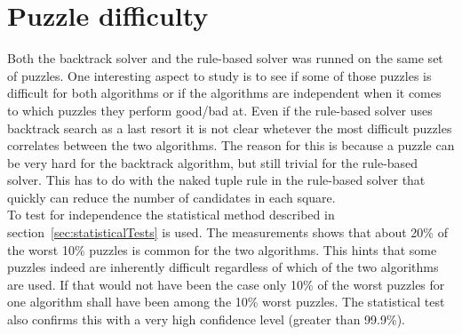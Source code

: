 \documentclass[a4paper,11pt]{kth-mag}
\begin{document}
\FloatBarrier
\section{Puzzle difficulty}
\label{sec:difficultyAnalysis}
Both the backtrack solver and the rule-based solver was runned on the same set of puzzles. One interesting aspect to study is to see if some of those puzzles is difficult for both algorithms or if the algorithms are independent when it comes to which puzzles they perform good/bad at.
Even if the rule-based solver uses backtrack search as a last resort it is not clear whetever the most difficult puzzles correlates between the two algorithms.
The reason for this is because a puzzle can be very hard for the backtrack algorithm, but still trivial for the rule-based solver. 
This has to do with the naked tuple rule in the rule-based solver that quickly can reduce the number of candidates in each square.
\\
To test for independence the statistical method described in section~\ref{sec:statisticalTests} is used.
The measurements shows that about 20\% of the worst 10\% puzzles is common for the two algorithms. 
This hints that some puzzles indeed are inherently difficult regardless of which of the two algorithms are used.
If that would not have been the case only 10\% of the worst puzzles for one algorithm shall have been among the 10\% worst puzzles.
The statistical test also confirms this with a very high confidence level (greater than 99.9\%).
\end{document}
